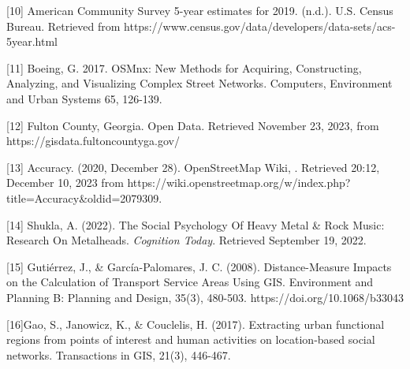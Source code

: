 \documentclass[11pt]{article}
\begin{document}
{[}10{]} American Community Survey 5-year estimates for 2019. (n.d.). U.S. Census Bureau. Retrieved from https://www.census.gov/data/developers/data-sets/acs-5year.html

{[}11{]} Boeing, G. 2017. OSMnx: New Methods for Acquiring, Constructing, Analyzing, and Visualizing Complex Street Networks. Computers, Environment and Urban Systems 65, 126-139.

{[}12{]} Fulton County, Georgia. Open Data. Retrieved November 23, 2023, from https://gisdata.fultoncountyga.gov/

{[}13{]} Accuracy. (2020, December 28). OpenStreetMap Wiki, . Retrieved 20:12, December 10, 2023 from https://wiki.openstreetmap.org/w/index.php?title=Accuracy\&oldid=2079309.

{[}14{]} Shukla, A. (2022). The Social Psychology Of Heavy Metal \& Rock Music: Research On Metalheads. \textit{Cognition Today}. Retrieved September 19, 2022.

{[}15{]} Gutiérrez, J., & García-Palomares, J. C. (2008). Distance-Measure Impacts on the Calculation of Transport Service Areas Using GIS. Environment and Planning B: Planning and Design, 35(3), 480-503. https://doi.org/10.1068/b33043

{[}16{]}Gao, S., Janowicz, K., & Couclelis, H. (2017). Extracting urban functional regions from points of interest and human activities on location‐based social networks. Transactions in GIS, 21(3), 446-467.













    
    
    
\end{document}
